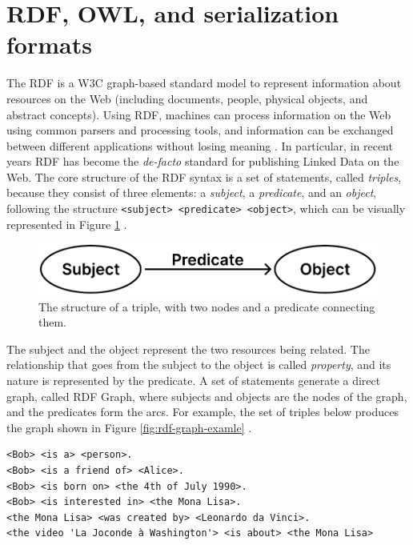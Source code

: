 \section{RDF, OWL, and serialization formats}
\label{sec:rdf-owl-formats}

The \acf{RDF} is a \ac{W3C} graph-based standard model to represent information about resources on the Web (including documents, people, physical objects, and abstract concepts). Using \ac{RDF}, machines can process information on the Web using common parsers and processing tools, and information can be exchanged between different applications without losing meaning \cite{world2014rdfprimer}. In particular, in recent years \ac{RDF} has become the \textit{de-facto} standard for publishing Linked Data on the Web. The core structure of the \ac{RDF} syntax is a set of statements, called \textit{triples}, because they consist of three elements: a \textit{subject}, a \textit{predicate}, and an \textit{object}, following the structure \verb#<subject> <predicate> <object>#, which can be visually represented in Figure \ref{fig:rdf-graph-structure} \cite{world2014rdfconcepts}.

\begin{figure}[!ht]
    \centering
    \includegraphics[width=0.55\columnwidth]{images/rdf/rdf-graph-structure}
    \caption{The structure of a triple, with two nodes and a predicate connecting them.}
    \label{fig:rdf-graph-structure}
\end{figure}

The subject and the object represent the two resources being related. The relationship that goes from the subject to the object is called \textit{property}, and its nature is represented by the predicate. A set of statements generate a direct graph, called RDF Graph, where subjects and objects are the nodes of the graph, and the predicates form the arcs. For example, the set of triples below produces the graph shown in Figure \ref{fig:rdf-graph-examle} \cite{world2014rdfprimer}.

\begin{verbatim}
<Bob> <is a> <person>.
<Bob> <is a friend of> <Alice>.
<Bob> <is born on> <the 4th of July 1990>.
<Bob> <is interested in> <the Mona Lisa>.
<the Mona Lisa> <was created by> <Leonardo da Vinci>.
<the video 'La Joconde à Washington'> <is about> <the Mona Lisa>
\end{verbatim}

